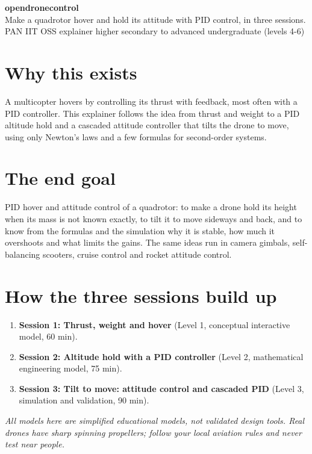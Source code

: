 \documentclass[11pt,a4paper]{article}
\begin{document}
\begin{center}{\LARGE\bfseries opendronecontrol}\\[0.4em]{\large Make a quadrotor hover and hold its attitude with PID control, in three sessions.}\\[0.2em]\small PAN IIT OSS explainer \textbullet{} higher secondary to advanced undergraduate (levels 4-6)\end{center}

\section*{Why this exists}
A multicopter hovers by controlling its thrust with feedback, most often with a PID controller. This explainer follows the idea from thrust and weight to a PID altitude hold and a cascaded attitude controller that tilts the drone to move, using only Newton's laws and a few formulas for second-order systems.

\section*{The end goal}
PID hover and attitude control of a quadrotor: to make a drone hold its height when its mass is not known exactly, to tilt it to move sideways and back, and to know from the formulas and the simulation why it is stable, how much it overshoots and what limits the gains. The same ideas run in camera gimbals, self-balancing scooters, cruise control and rocket attitude control.

\section*{How the three sessions build up}
\begin{enumerate}[nosep]
\item \textbf{Session 1: Thrust, weight and hover} (Level 1, conceptual interactive model, 60 min).
\item \textbf{Session 2: Altitude hold with a PID controller} (Level 2, mathematical engineering model, 75 min).
\item \textbf{Session 3: Tilt to move: attitude control and cascaded PID} (Level 3, simulation and validation, 90 min).
\end{enumerate}

\emph{All models here are simplified educational models, not validated design tools. Real drones have sharp spinning propellers; follow your local aviation rules and never test near people.}
\end{document}
